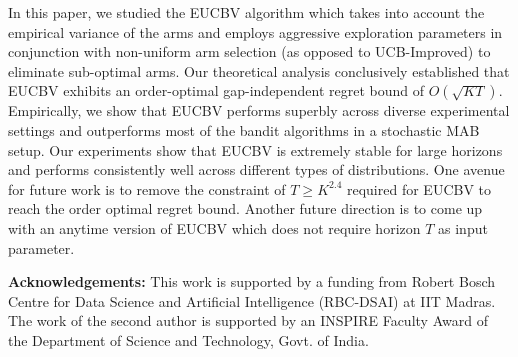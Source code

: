 In this paper, we studied the EUCBV algorithm which takes into account the empirical variance of the arms and employs aggressive exploration parameters in conjunction with non-uniform arm selection (as opposed to UCB-Improved) to eliminate sub-optimal arms. Our theoretical analysis conclusively established that EUCBV exhibits an order-optimal gap-independent regret bound of $O(\sqrt{KT})$. Empirically, we show that EUCBV performs superbly across diverse experimental settings and outperforms most of the bandit algorithms in a stochastic MAB setup. Our experiments show that EUCBV is extremely stable for large horizons and performs consistently well across different types of distributions. One avenue for future work is to remove the constraint of $T\geq K^{2.4}$ required for EUCBV to reach the order optimal regret bound. Another future direction is to come up with an anytime version of EUCBV which does not require horizon $T$ as input parameter.

\textbf{Acknowledgements:} This work is supported by a funding from Robert
Bosch Centre for Data Science and Artificial Intelligence (RBC-DSAI) at IIT Madras. The work of the second author is supported by an INSPIRE Faculty Award of the Department of Science and Technology, Govt. of India. 

%